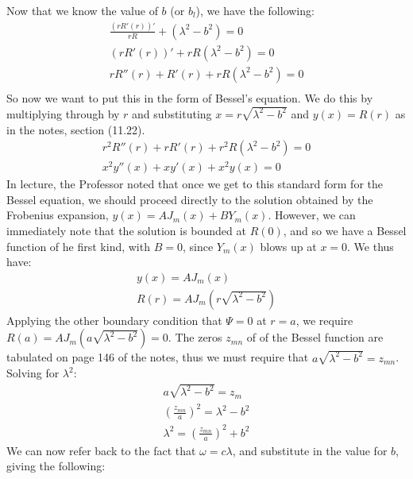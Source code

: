 \documentclass{article}
\begin{document}
Now that we know the value of $b$ (or $b_l$), we have the following:
\begin{equation}
\begin{aligned}
\frac{(rR'(r))'}{rR} +(\lambda^2 - b^2) = 0\\ 
(rR'(r))' + rR(\lambda^2 - b^2) = 0\\
rR''(r) + R'(r) + rR(\lambda^2 - b^2) = 0\\ 
\end{aligned}
\end{equation}
So now we want to put this in the form of Bessel's equation. We do this by multiplying through by $r$ and substituting $x = r\sqrt{\lambda^2-b^2}$ and $y(x) = R(r)$ as in the notes, section (11.22). 
\begin{equation}
\begin{aligned}
r^2R''(r) + rR'(r) + r^2R(\lambda^2 - b^2) = 0\\ 
x^2y''(x) + xy'(x) + x^2y(x) = 0
\end{aligned}
\end{equation}
In lecture, the Professor noted that once we get to this standard form for the Bessel equation, we should proceed directly to the solution obtained by the Frobenius expansion, $y(x) = AJ_m(x) + BY_m(x)$. However, we can immediately note that the solution is bounded at $R(0)$, and so we have a Bessel function of he first kind, with $B=0$, since $Y_m(x)$ blows up at $x=0$. We thus have:
\begin{equation}
\begin{aligned}
y(x) = AJ_m(x)\\
R(r) = AJ_m(r\sqrt{\lambda^2 - b^2})
\end{aligned}
\end{equation}
Applying the other boundary condition that $\Psi = 0$ at $r=a$, we require $R(a) = AJ_m(a\sqrt{\lambda^2 - b^2}) = 0$. The zeros $z_{mn}$ of of the Bessel function are tabulated on page 146 of the notes, thus we must require that $a\sqrt{\lambda^2 - b ^2} = z_{mn}$. Solving for $\lambda^2$:
\begin{equation}
\begin{aligned}
a\sqrt{\lambda^2 - b ^2} = z_m\\
(\frac{z_{mn}}{a})^2 = \lambda^2 - b^2\\
\lambda^2 = (\frac{z_{mn}}{a})^2 + b^2
\end{aligned}
\end{equation}
We can now refer back to the fact that $\omega=c\lambda$, and substitute in the value for $b$, giving the following:
\end{document}
